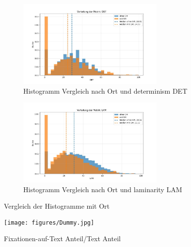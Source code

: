 \documentclass[
    language=german, %
    thesis=seminar, %
    supervisor=postdoc, %
    multiauthor=true, %
    ]{settings/csssa-thesis}
\begin{document}
\begin{figure}[ht]
    \centering
    \begin{subfigure}{0.49\textwidth}
        \centering
        \includegraphics[width=0.8\textwidth]{figures/Bild24.jpeg}
        \caption{Histogramm Vergleich nach Ort und determinism DET }\label{fig:Bild20a}
    \end{subfigure}
    \begin{subfigure}{0.49\textwidth}
        \centering
        \includegraphics[width=0.8\textwidth]{figures/Bild25.jpeg}
        \caption{Histogramm Vergleich nach Ort und laminarity LAM}\label{fig:Bild20b}
    \end{subfigure}\label{fig:Bild20}
    \caption{Vergleich der Histogramme mit Ort}
\end{figure}

\begin{figure}[h]
    \centering
    \texttt{[image: figures/Dummy.jpg]}
    \caption{Fixationen-auf-Text Anteil/Text Anteil}\label{fig:bild26}
\end{figure}
\end{document}
